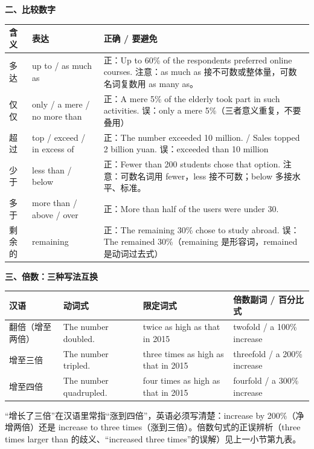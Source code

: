 \documentclass[11pt,a4paper]{ctexart}
\newcommand{\tip}[1]{\par\addvspace{3pt}\noindent{\bfseries【提示】}#1\par\addvspace{3pt}}
\begin{document}
\par\addvspace{5pt}\noindent\textbf{二、比较数字}\par\addvspace{2pt}
\begin{longtable}{L{2.4cm}L{5.9cm}L{7.4cm}}
\toprule
\textbf{含义} & \textbf{表达} & \textbf{正确 / 要避免} \\
\midrule
\endhead
多达 & up to / as much as & 正：Up to 60\% of the respondents preferred online courses. 注意：as much as 接不可数或整体量，可数名词复数用 as many as。 \\
仅仅 & only / a mere / no more than & 正：A mere 5\% of the elderly took part in such activities. 误：only a mere 5\%（三者意义重复，不要叠用） \\
超过 & top / exceed / in excess of & 正：The number exceeded 10 million. / Sales topped 2 billion yuan. 误：exceeded than 10 million \\
少于 & less than / below & 正：Fewer than 200 students chose that option. 注意：可数名词用 fewer，less 接不可数；below 多接水平、标准。 \\
多于 & more than / above / over & 正：More than half of the users were under 30. \\
剩余的 & remaining & 正：The remaining 30\% chose to study abroad. 误：The remained 30\%（remaining 是形容词，remained 是动词过去式） \\
\bottomrule
\end{longtable}

\par\addvspace{5pt}\noindent\textbf{三、倍数：三种写法互换}\par\addvspace{2pt}
\begin{longtable}{L{2.1cm}L{3.1cm}L{4.1cm}L{5.9cm}}
\toprule
\textbf{汉语} & \textbf{动词式} & \textbf{限定词式} & \textbf{倍数副词 / 百分比式} \\
\midrule
\endhead
翻倍（增至两倍） & The number doubled. & twice as high as that in 2015 & twofold / a 100\% increase \\
增至三倍 & The number tripled. & three times as high as that in 2015 & threefold / a 200\% increase \\
增至四倍 & The number quadrupled. & four times as high as that in 2015 & fourfold / a 300\% increase \\
\bottomrule
\end{longtable}

\tip{“增长了三倍”在汉语里常指“涨到四倍”，英语必须写清楚：increase by 200\%（净增两倍）还是 increase to three times（涨到三倍）。倍数句式的正误辨析（three times larger than 的歧义、“increased three times”的误解）见上一小节第九表。}
\end{document}

